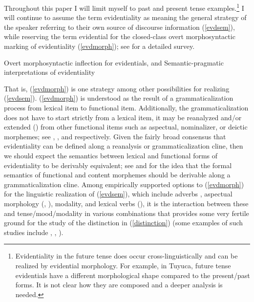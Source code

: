 \documentclass{article}
\begin{document}
 
Throughout this paper I will limit myself to past and present tense examples.\footnote{Evidentiality in the future tense does occur cross-linguistically and can be realized by evidential morphology. For example, in Tuyuca, future tense evidentials have a different morphological shape compared to the present/past forms. It is not clear how they are composed and a deeper analysis is needed.} I will continue to assume the term {\sc evidentiality} as meaning the general strategy of the speaker referring to their own source of discourse information (\ref{evdsem}), while reserving the term {\sc evidential} for the closed-class overt morphosyntactic marking of evidentiality (\ref{evdmorph}); see \cite{aikhenvald04evd} for a detailed survey.  

\begin{exe}
\ex \label{distinction}
\begin{xlist}
\ex Overt morphosyntactic inflection for evidentials, and\label{evdmorph}
\ex Semantic-pragmatic interpretations of evidentiality\label{evdsem}
\end{xlist}
\end{exe}

That is, (\ref{evdmorph}) is one strategy among other possibilities for realizing (\ref{evdsem}). (\ref{evdmorph}) is understood as the result of a grammaticalization process from lexical item to functional item. Additionally, the grammaticalization does not have to start strictly from a lexical item, it may be reanalyzed and/or extended () from other functional items such as aspectual, nominalizer, or deictic morphemes; see \cite{campbell91grammestonian}, \cite{fleck07evddoubletense}, and \cite{dehaan01visualevd} respectively. Given the fairly broad consensus that evidentiality can be defined along a reanalysis or grammaticalization cline, then we should expect the semantics between lexical and functional forms of evidentiality to be derivably equivalent; see \citet{fintel95formalsemgramm} and  for the idea that the formal semantics of functional and content morphemes should be derivable along a grammaticalization cline. Among empirically supported options to (\ref{evdmorph}) for the linguistic realization of (\ref{evdsem}), which include adverbs \citep{cinque99adverbs}, aspectual morphology (\citealt{johnsonutas:2000}, \citealt{stenzel04wanano}), modality, and lexical verbs (\citealt{traugott89epistemic}), it is the interaction between these and tense/mood/modality in various combinations that provides some very fertile ground for the study of the distinction in (\ref{distinction}) (some examples of such studies include \citealt{bowles08thesis,bowles08fusedte}, \citealt{chung:2005}, \citealt{speas04evdparadigms,speas08synsemevd}).
\end{document}
